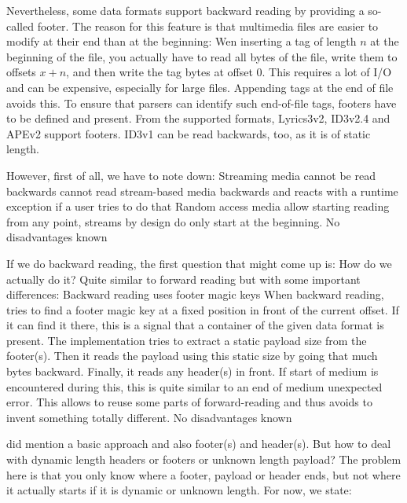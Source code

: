 Nevertheless, some data formats support backward reading by providing a so-called footer. The reason for this feature is that multimedia files are easier to modify at their end than at the beginning: Wen inserting a tag of length $n$ at the beginning of the file, you actually have to read all bytes of the file, write them to offsets $x+n$, and then write the tag bytes at offset 0. This requires a lot of I/O and can be expensive, especially for large files. Appending tags at the end of file avoids this. To ensure that parsers can identify such end-of-file tags, footers have to be defined and present. From the supported formats, Lyrics3v2, ID3v2.4 and APEv2 support footers. ID3v1 can be read backwards, too, as it is of static length.

However, first of all, we have to note down:
{%
Streaming media cannot be read backwards
}
{%
\LibName{} cannot read stream-based media backwards and reacts with a runtime exception if a user tries to do that
}
{%
Random access media allow starting reading from any point, streams by design do only start at the beginning.
}
{%
No disadvantages known
}

If we do backward reading, the first question that might come up is: How do we actually do it? Quite similar to forward reading but with some important differences:
{%
Backward reading uses footer magic keys
}
{%
When backward reading, \COMPdataPartManagement{} tries to find a footer magic key at a fixed position in front of the current offset. If it can find it there, this is a signal that a container of the given data format is present. The implementation tries to extract a static payload size from the footer(s). Then it reads the payload using this static size by going that much bytes backward. Finally, it reads any header(s) in front. If start of medium is encountered during this, this is quite similar to an end of medium unexpected error.
}
{%
This allows to reuse some parts of forward-reading and thus avoids to invent something totally different.
}
{%
No disadvantages known
}

 did mention a basic approach and also footer(s) and header(s). But how to deal with dynamic length headers or footers or unknown length payload? The problem here is that you only know where a footer, payload or header ends, but not where it actually starts if it is dynamic or unknown length. For now, we state:

